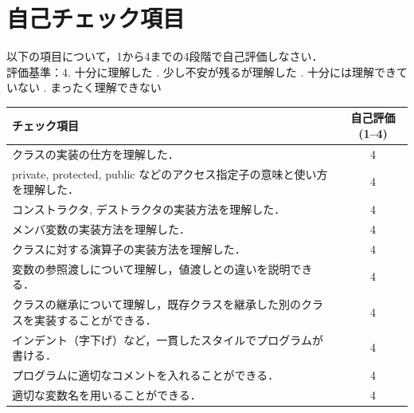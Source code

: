 \documentclass[paper=a4,fontsize=11pt]{jlreq}
\begin{document}
\section{自己チェック項目}
以下の項目について，1から4までの4段階で自己評価しなさい． \\ %
評価基準：4. 十分に理解した . 少し不安が残るが理解した . 十分には理解できていない . まったく理解できない %

\begin{table}[h]
\centering
\begin{tabular}{|p{11.5cm}|c|}
\hline
\textbf{チェック項目} & \textbf{自己評価 (1--4)} \\ \hline
クラスの実装の仕方を理解した． & 4 \\ \hline %
private, protected, public などのアクセス指定子の意味と使い方を理解した． & 4 \\ \hline %
コンストラクタ, デストラクタの実装方法を理解した． & 4 \\ \hline %
メンバ変数の実装方法を理解した． & 4 \\ \hline %
クラスに対する演算子の実装方法を理解した． & 4 \\ \hline %
変数の参照渡しについて理解し，値渡しとの違いを説明できる． & 4 \\ \hline %
クラスの継承について理解し，既存クラスを継承した別のクラスを実装することができる． & 4 \\ \hline %
インデント（字下げ）など，一貫したスタイルでプログラムが書ける． & 4 \\ \hline %
プログラムに適切なコメントを入れることができる． & 4 \\ \hline %
適切な変数名を用いることができる． & 4 \\ \hline %
\end{tabular}
\end{table}
\end{document}
